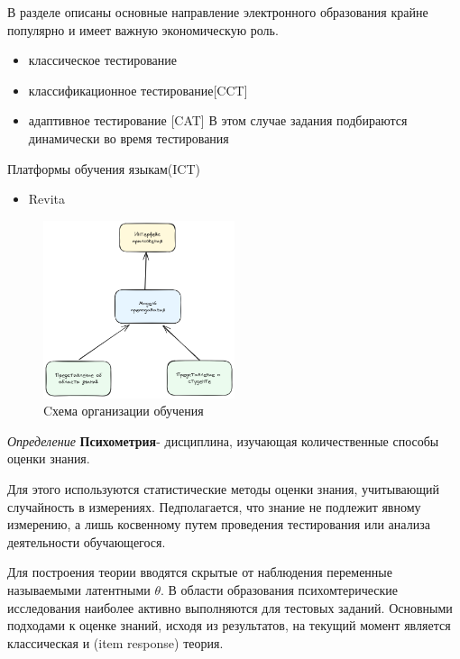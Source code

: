 В разделе описаны основные направление электронного образования 
крайне популярно и имеет важную экономическую роль.


\begin{itemize}
    \item классическое тестирование
    \item классификационное тестирование[CCT] 
    \item адаптивное тестирование [CAT]
    В этом случае задания подбираются динамически во время тестирования
\end{itemize}


Платформы обучения языкам(ICT) \begin{itemize}
    \item Revita \cite{katinskaia2018revita}
\end{itemize}


\begin{figure}[h]
    \centering
    \includegraphics[width=0.5\textwidth]{assets/pedagogic/social/its.excalidraw.png}
    \caption{Cхема организации обучения}
    \label{bkt}
\end{figure}


\textit{Определение} \textbf{Психометрия}- дисциплина, изучающая количественные способы оценки знания.

Для этого используются статистические методы оценки знания, учитывающий случайность в измерениях.
Педполагается, что знание не подлежит явному измерению,
а лишь косвенному путем проведения тестирования или анализа деятельности обучающегося.

Для построения теории вводятся скрытые от наблюдения переменные называемыми латентными $\theta$.
В области образования психомтерические исследования наиболее активно выполняются для тестовых заданий. 
Основными подходами к оценке знаний, исходя из результатов, 
на текущий момент является классическая и (item response) теория.

